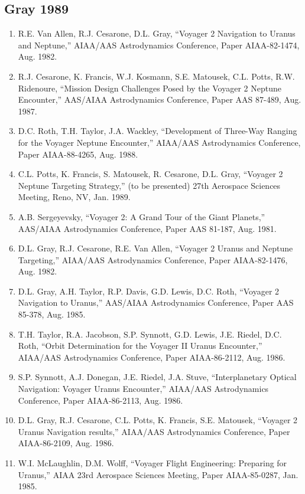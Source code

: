 \documentclass[12pt]{article}
\begin{document}
\subsection*{Gray 1989}
\begin{enumerate}
\item R.E. Van Allen, R.J. Cesarone, D.L. Gray, ``Voyager 2 Navigation to Uranus and Neptune,'' AIAA/AAS Astrodynamics Conference, Paper AIAA-82-1474, Aug. 1982.
\item R.J. Cesarone, K. Francis, W.J. Kosmann, S.E. Matousek, C.L. Potts, R.W. Ridenoure, ``Mission Design Challenges Posed by the Voyager 2 Neptune Encounter,'' AAS/AIAA Astrodynamics Conference, Paper AAS 87-489, Aug. 1987.
\item D.C. Roth, T.H. Taylor, J.A. Wackley, ``Development of Three-Way Ranging for the Voyager Neptune Encounter,'' AIAA/AAS Astrodynamics Conference, Paper AIAA-88-4265, Aug. 1988.
\item C.L. Potts, K. Francis, S. Matousek, R. Cesarone, D.L. Gray, ``Voyager 2 Neptune Targeting Strategy,'' (to be presented) 27th Aerospace Sciences Meeting, Reno, NV, Jan. 1989.
\item A.B. Sergeyevsky, ``Voyager 2: A Grand Tour of the Giant Planets,'' AAS/AIAA Astrodynamics Conference, Paper AAS 81-187, Aug. 1981.
\item D.L. Gray, R.J. Cesarone, R.E. Van Allen, ``Voyager 2 Uranus and Neptune Targeting,'' AIAA/AAS Astrodynamics Conference, Paper AIAA-82-1476, Aug. 1982.
\item D.L. Gray, A.H. Taylor, R.P. Davis, G.D. Lewis, D.C. Roth, ``Voyager 2 Navigation to Uranus,'' AAS/AIAA Astrodynamics Conference, Paper AAS 85-378, Aug. 1985.
\item T.H. Taylor, R.A. Jacobson, S.P. Synnott, G.D. Lewis, J.E. Riedel, D.C. Roth, ``Orbit Determination for the Voyager II Uranus Encounter,'' AIAA/AAS Astrodynamics Conference, Paper AIAA-86-2112, Aug. 1986.
\item S.P. Synnott, A.J. Donegan, J.E. Riedel, J.A. Stuve, ``Interplanetary Optical Navigation: Voyager Uranus Encounter,'' AIAA/AAS Astrodynamics Conference, Paper AIAA-86-2113, Aug. 1986.
\item D.L. Gray, R.J. Cesarone, C.L. Potts, K. Francis, S.E. Matousek, ``Voyager 2 Uranus Navigation results,'' AIAA/AAS Astrodynamics Conference, Paper AIAA-86-2109, Aug. 1986.
\item W.I. McLaughlin, D.M. Wolff, ``Voyager Flight Engineering: Preparing for Uranus,'' AIAA 23rd Aerospace Sciences Meeting, Paper AIAA-85-0287, Jan. 1985.

\end{enumerate}
\end{document}
